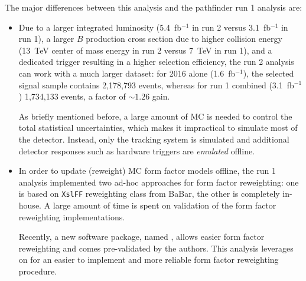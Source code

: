 The major differences between this analysis and the pathfinder run 1 \RDX
analysis are:
\begin{itemize}
    \item Due to a larger integrated luminosity
        (5.4~fb$^{-1}$ in run 2 versus 3.1~fb$^{-1}$ in run 1),
        a larger $B$ production cross section due to higher collision energy
        (13~TeV center of mass energy in run 2 versus 7~TeV in run 1),
        and a dedicated trigger resulting in a higher selection efficiency,
        the run 2 analysis can work with a much larger dataset:
        for 2016 alone (1.6~fb$^{-1}$),
        the selected \Dz\mun signal sample contains 2,178,793 events,
        whereas for run 1 combined (3.1~fb$^{-1}$) 1,734,133 events,
        a factor of $\sim\!1.26$ gain.

        As briefly mentioned before,
        a large amount of MC is needed to control the total statistical
        uncertainties,
        which makes it impractical to simulate most of the detector.
        Instead, only the tracking system is simulated and additional detector
        responses such as hardware triggers are \emph{emulated} offline.

    \item In order to update (reweight) MC form factor models offline,
        the run 1 analysis implemented two ad-hoc approaches for form factor
        reweighting:
        one is based on \texttt{XslFF} reweighting class from BaBar,
        the other is completely in-house.
        A large amount of time is spent on validation of the form factor
        reweighting implementations.

        Recently, a new software package, named \Hammer, allows easier form
        factor reweighting and comes pre-validated by the \Hammer authors.
        This analysis leverages on \Hammer for an easier to implement and more
        reliable form factor reweighting procedure.
\end{itemize}


